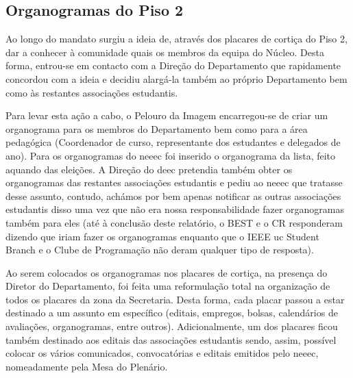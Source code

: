 
\subsection{Organogramas do Piso 2} \label{subsec:organogramasPiso2}

Ao longo do mandato surgiu a ideia de, através dos placares de cortiça do Piso 2, dar a conhecer à comunidade quais os membros da equipa do Núcleo. Desta forma, entrou-se em contacto com a Direção do Departamento que rapidamente concordou com a ideia e decidiu alargá-la também ao próprio Departamento bem como às restantes associações estudantis.

Para levar esta ação a cabo, o Pelouro da Imagem encarregou-se de criar um organograma para os membros do Departamento bem como para a área pedagógica (Coordenador de curso, representante dos estudantes e delegados de ano). Para os organogramas do \acrshort{neeec} foi inserido o organograma da lista, feito aquando das eleições. A Direção do \acrshort{deec} pretendia também obter os organogramas das restantes associações estudantis e pediu ao \acrshort{neeec} que tratasse desse assunto, contudo, achámos por bem apenas notificar as outras associações estudantis disso uma vez que não era nossa responsabilidade fazer organogramas também para eles (até à conclusão deste relatório, o BEST e o CR responderam dizendo que iriam fazer os organogramas enquanto que o IEEE \acrshort{uc} Student Branch e o Clube de Programação não deram qualquer tipo de resposta).

Ao serem colocados os organogramas nos placares de cortiça, na presença do Diretor do Departamento, foi feita uma reformulação total na organização de todos os placares da zona da Secretaria. Desta forma, cada placar passou a estar destinado a um assunto em específico (editais, empregos, bolsas, calendários de avaliações, organogramas, entre outros). Adicionalmente, um dos placares ficou também destinado aos editais das associações estudantis sendo, assim, possível colocar os vários comunicados, convocatórias e editais emitidos pelo \acrshort{neeec}, nomeadamente pela Mesa do Plenário.